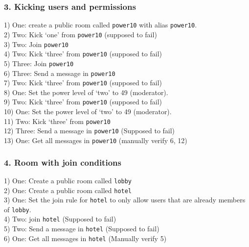 \documentclass{article}
\begin{document}
\subsubsection*{3. Kicking users and permissions}
1) One: create a public room called \texttt{power10} with alias \texttt{power10}.\\
2) Two: Kick `one' from \texttt{power10} (supposed to fail)\\
3) Two: Join \texttt{power10}\\
4) Two: Kick `three' from \texttt{power10} (supposed to fail)\\
5) Three: Join \texttt{power10}\\
6) Three: Send a message in \texttt{power10}\\
7) Two: Kick `three' from \texttt{power10} (supposed to fail)\\
8) One: Set the power level of `two' to 49 (moderator).\\
9) Two: Kick `three' from \texttt{power10} (supposed to fail)\\
10) One: Set the power level of `two' to 49 (moderator).\\
11) Two: Kick `three' from \texttt{power10}\\
12) Three: Send a message in \texttt{power10} (Supposed to fail)\\
13) One: Get all messages in \texttt{power10} (manually verify 6, 12)

\subsubsection*{4. Room with join conditions}
1) One: Create a public room called \texttt{lobby}\\
2) One: Create a public room called \texttt{hotel}\\
3) One: Set the join rule for \texttt{hotel} to only allow users that are already members of \texttt{lobby}.\\
4) Two: join \texttt{hotel} (Supposed to fail)\\
5) Two: Send a message in \texttt{hotel} (Supposed to fail)\\
6) One: Get all messages in \texttt{hotel} (Manually verify 5)
\end{document}
